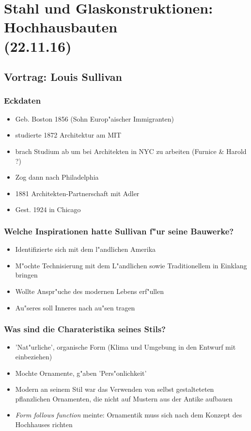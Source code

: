 \documentclass[a5paper]{scrartcl}
\begin{document}
\section{Stahl und Glaskonstruktionen: Hochhausbauten\\(22.11.16)}

\subsection{Vortrag: Louis Sullivan}

\subsubsection{Eckdaten}

\begin{itemize}
  \item Geb. Boston 1856 (Sohn Europ"aischer Immigranten) 
  \item studierte 1872 Architektur am MIT
  \item brach Studium ab um bei Architekten in NYC zu arbeiten (Furnice \& Harold ?)
  \item Zog dann nach Philadelphia
  \item 1881 Architekten-Partnerschaft mit Adler
  \item Gest. 1924 in Chicago
\end{itemize}

\subsubsection{Welche Inspirationen hatte Sullivan f"ur seine Bauwerke?}

\begin{itemize}
  \item Identifizierte sich mit dem l"andlichen Amerika
  \item M"ochte Technisierung mit dem L"andlichen sowie Traditionellem in Einklang bringen
  \item Wollte Anspr"uche des modernen Lebens erf"ullen
  \item Au"seres soll Inneres nach au"sen tragen
\end{itemize}

\subsubsection{Was sind die Charateristika seines Stils?}

\begin{itemize}
  \item 'Nat"urliche', organische Form (Klima und Umgebung in den Entwurf mit einbeziehen)
  \item Mochte Ornamente, g"aben 'Pers"onlichkeit'
  \item Modern an seinem Stil war das Verwenden von selbst gestalteteten pflanzlichen Ornamenten, die nicht auf Mustern aus der Antike aufbauen
  \item \emph{Form follows function} meinte: Ornamentik muss sich nach dem Konzept des Hochhauses richten
\end{itemize}
\end{document}
